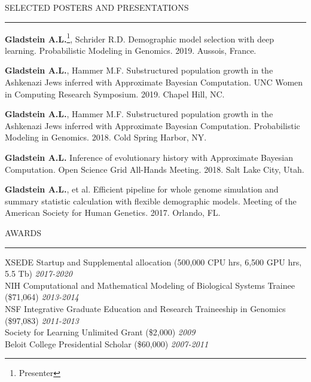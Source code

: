\documentclass{resume} %
\renewenvironment{rSection}[1]{
\sectionskip
\textcolor{RoyalPurple}{\MakeUppercase{#1}}
\sectionlineskip
\hrule
\begin{list}{}{
\setlength{\leftmargin}{1.5em}
}
\item[]
}{
\end{list}
}
\begin{document}
\newpage


\begin{rSection}{Selected Posters and Presentations}

\item \textbf{Gladstein A.L.}\footnote{Presenter}, Schrider R.D.  Demographic model selection with deep learning.  Probabilistic Modeling in Genomics. 2019. Aussois, France.

\item \textbf{Gladstein A.L.}\textsuperscript{\textdagger}, Hammer M.F. Substructured population growth in the Ashkenazi Jews inferred with Approximate Bayesian Computation. UNC Women in Computing Research Symposium. 2019. Chapel Hill, NC.

\item \textbf{Gladstein A.L.}\textsuperscript{\textdagger}, Hammer M.F. Substructured population growth in the Ashkenazi Jews inferred with Approximate Bayesian Computation. Probabilistic Modeling in Genomics. 2018. Cold Spring Harbor, NY.

\item \textbf{Gladstein A.L.}\textsuperscript{\textdagger} Inference of evolutionary history with Approximate Bayesian Computation. Open Science Grid All-Hands Meeting. 2018. Salt Lake City, Utah.

\item \textbf{Gladstein A.L.}\textsuperscript{\textdagger}, et al. Efficient pipeline for whole genome simulation and summary statistic calculation with flexible demographic models. Meeting of the American Society for Human Genetics. 2017. Orlando, FL.

\end{rSection}


\begin{rSection}{Awards}

XSEDE Startup and Supplemental allocation (500,000 CPU hrs, 6,500 GPU hrs, 5.5 Tb) \hfill{\em 2017-2020}\\
NIH Computational and Mathematical Modeling of Biological Systems Trainee (\$71,064) \hfill {\em 2013-2014}\\
NSF Integrative Graduate Education and Research Traineeship in Genomics (\$97,083) \hfill {\em 2011-2013}\\
Society for Learning Unlimited Grant (\$2,000) \hfill {\em 2009}\\
Beloit College Presidential Scholar (\$60,000) \hfill {\em 2007-2011}

\end{rSection}
\end{document}
